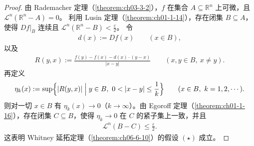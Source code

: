 \documentclass[../../main.tex]{subfiles}%
\begin{document}
\begin{proof}
由 Rademacher 定理（\cref{theorem:ch03-3-2}），$f$ 在集合 $A\subseteq\mathbb{R}^n$ 上可微，且 $\mathcal{L}^n(\mathbb{R}^n-A)=0$。%
利用 Lusin 定理（\cref{theorem:ch01-1-14}），存在闭集 $B\subseteq A$，使得 $Df|_B$ 连续且 $\mathcal{L}^n(\mathbb{R}^n-B)<\frac{\varepsilon}{2}$。%
令
\begin{align*}
d(x):=Df(x)\qquad(x\in B),
\end{align*}
以及
\begin{align*}
R(y,x):=\frac{f(y)-f(x)-d(x)\cdot(y-x)}{\lvert x-y\rvert}\qquad(x,y\in B,\ x\ne y).
\end{align*}
再定义
\begin{align*}
\eta_k(x):=\sup\Bigl\{\lvert R(y,x)\rvert\Bigm|y\in B,\ 0<\lvert x-y\rvert\le\frac1k\Bigr\}\qquad(x\in B,\ k=1,2,\cdots).
\end{align*}
则对一切 $x\in B$ 有 $\eta_k(x)\to0$（$k\to\infty$）。由 Egoroff 定理（\cref{theorem:ch01-1-16}），存在闭集 $C\subseteq B$，使得 $\eta_k\to0$ 在 $C$ 的紧子集上一致，并且%
\begin{align*}
\mathcal{L}^n(B-C)\le\frac{\varepsilon}{2}.
\end{align*}
这表明 Whitney 延拓定理（\cref{theorem:ch06-6-10}）的假设 $(\star)$ 成立。%


\end{proof}
\end{document}
